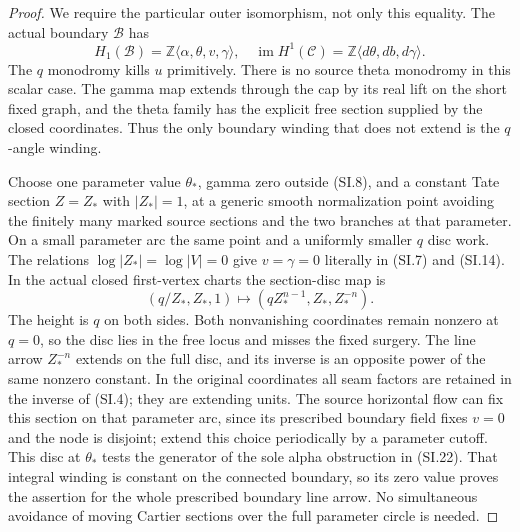 \begin{proof}
We require the particular outer isomorphism, not only this equality.
The actual boundary \(\mathcal B\) has
\[
 H_1(\mathcal B)=\mathbb Z\langle\alpha,\theta,v,\gamma\rangle,
 \quad \operatorname{im}H^1(\mathcal C)=
       \mathbb Z\langle d\theta,db,d\gamma\rangle.
                                                        \tag{SI.22}
\]
The \(q\) monodromy kills \(u\) primitively. There is no source theta
monodromy in this scalar case. The gamma map extends through the cap
by its real lift on the short fixed graph, and the theta family has
the explicit free section supplied by the closed coordinates.
Thus the only boundary winding that does not extend is the
\(q\)-angle winding.

Choose one parameter value \(\theta_*\), gamma zero outside (SI.8),
and a constant Tate section \(Z=Z_*\) with \(|Z_*|=1\), at a generic
smooth normalization point avoiding the finitely many marked source
sections and the two branches at that parameter. On a small parameter
arc the same point and a uniformly smaller \(q\) disc work. The
relations \(\log|Z_*|=\log|V|=0\) give \(v=\gamma=0\) literally in
(SI.7) and (SI.14). In the actual closed first-vertex charts the
section-disc map is
\[
 (q/Z_*,Z_*,1)\longmapsto
              (qZ_*^{n-1},Z_*,Z_*^{-n}).              \tag{SI.23}
\]
The height is \(q\) on both sides. Both nonvanishing coordinates
remain nonzero at \(q=0\), so the disc lies in the free locus and
misses the fixed surgery. The line arrow \(Z_*^{-n}\) extends on
the full disc, and its inverse is an opposite power of the same
nonzero constant. In the original coordinates all seam factors
are retained in the inverse of (SI.4); they are extending units.
The source horizontal flow can fix this section on that parameter
arc, since its prescribed boundary field fixes \(v=0\) and the node
is disjoint; extend this choice periodically by a parameter cutoff.
This disc at \(\theta_*\) tests the generator of the sole alpha
obstruction in (SI.22). That integral winding is constant on the
connected boundary, so its zero value proves the assertion for the
whole prescribed boundary line arrow. No simultaneous avoidance of
moving Cartier sections over the full parameter circle is needed.


\end{proof}
